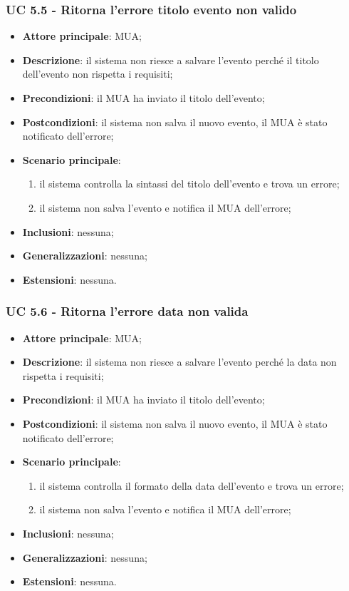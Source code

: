     \subsubsection{UC 5.5 - Ritorna l'errore titolo evento non valido} \label{sec:UC5.5}
    \begin{itemize}
        \item \textbf{Attore principale}: MUA;
        \item \textbf{Descrizione}: il sistema non riesce a salvare l'evento perché il titolo dell'evento non rispetta i requisiti;
        \item \textbf{Precondizioni}: il MUA ha inviato il titolo dell'evento;
        \item \textbf{Postcondizioni}: il sistema non salva il nuovo evento, il MUA è stato notificato dell'errore;
        \item \textbf{Scenario principale}:
            \begin{enumerate}
                \item il sistema controlla la sintassi del titolo dell'evento e trova un errore;
                \item il sistema non salva l'evento e notifica il MUA dell'errore;
            \end{enumerate}
        \item \textbf{Inclusioni}: nessuna;
        \item \textbf{Generalizzazioni}: nessuna;
        \item \textbf{Estensioni}: nessuna.
    \end{itemize}


    \subsubsection{UC 5.6 - Ritorna l'errore data non valida} \label{sec:UC5.6}
    \begin{itemize}
        \item \textbf{Attore principale}: MUA;
        \item \textbf{Descrizione}: il sistema non riesce a salvare l'evento perché la data non rispetta i requisiti;
        \item \textbf{Precondizioni}: il MUA ha inviato il titolo dell'evento;
        \item \textbf{Postcondizioni}: il sistema non salva il nuovo evento, il MUA è stato notificato dell'errore;
        \item \textbf{Scenario principale}:
            \begin{enumerate}
                \item il sistema controlla il formato della data dell'evento e trova un errore;
                \item il sistema non salva l'evento e notifica il MUA dell'errore;
            \end{enumerate}
        \item \textbf{Inclusioni}: nessuna;
        \item \textbf{Generalizzazioni}: nessuna;
        \item \textbf{Estensioni}: nessuna.
    \end{itemize}

